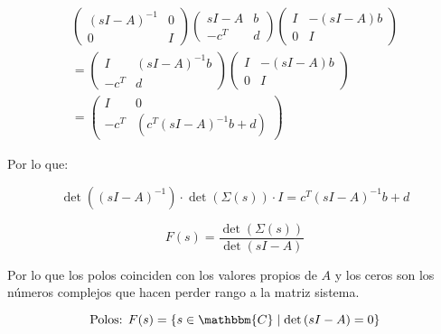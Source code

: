         \begin{multline}
            \begin{pmatrix}
            (sI - A)^{-1} & 0 \\
            0 & I
            \end{pmatrix}
            \begin{pmatrix}
            sI - A & b \\
            -c^T & d
            \end{pmatrix}
            \begin{pmatrix}
            I & -(sI - A)b \\
            0 & I
            \end{pmatrix}
            \\
            =
            \begin{pmatrix}
            I & (sI - A)^{-1} b \\
            -c^T & d
            \end{pmatrix}
            \begin{pmatrix}
            I & -(sI - A)b \\
            0 & I
            \end{pmatrix}
            \\
            =
            \begin{pmatrix}
            I & 0 \\
            -c^T & (c^T(sI - A)^{-1} b + d)
            \end{pmatrix}
            \nonumber
        \end{multline}

        Por lo que:

        \begin{equation*}
            \det{\left( (sI - A)^{-1} \right)} \cdot \det{\left( \Sigma(s) \right)} \cdot I = c^T(sI - A)^{-1} b + d
        \end{equation*}

        \begin{equation}
            F(s) = \frac{\det{\left( \Sigma(s) \right)}}{\det{\left( sI - A \right)}}
        \end{equation}

        Por lo que los polos coinciden con los valores propios de $A$ y los ceros son los números complejos que hacen perder rango a la matriz sistema.

        \begin{equation}
            \text{Polos: } F(s) = \left\{ s \in \mathbbm{C} \mid \det{\left( sI - A \right)} = 0 \right\}
        \end{equation}

